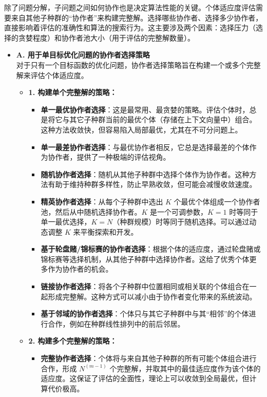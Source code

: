 除了问题分解，子问题之间如何协作也是决定算法性能的关键。个体适应度评估需要来自其他子种群的“协作者”来构建完整解。选择哪些协作者、选择多少协作者，直接影响着评估的准确性和算法的搜索行为。这主要涉及两个因素：选择压力（选择的贪婪程度）和协作者池大小（用于评估的完整解数量）。
\begin{itemize}
    \item \textbf{A. 用于单目标优化问题的协作者选择策略} \\
    对于只有一个目标函数的优化问题，协作者选择策略旨在构建一个或多个完整解来评估个体适应度。
    \begin{itemize}
        \item \textbf{1. 构建单个完整解的策略：}
        \begin{itemize}
            \item \textbf{单一最优协作者选择}：这是最常用、最贪婪的策略。评估个体时，总是将它与其它子种群当前的最优个体（存储在上下文向量中）组合。这种方法收敛快，但容易陷入局部最优，尤其在不可分问题上。
            \item \textbf{单一最差协作者选择}：与最优协作者相反，它总是选择最差的个体作为协作者，提供了一种极端的评估视角。
            \item \textbf{随机协作者选择}：随机从其他子种群中选择个体作为协作者。这种方法有助于维持种群多样性，防止早熟收敛，但可能会减慢收敛速度。
            \item \textbf{精英协作者选择}：从每个子种群中选出 $K$ 个最优个体组成一个协作者池，然后从中随机选择协作者。$K$ 是一个可调参数，$K=1$ 时等同于单一最优选择，$K=N$（种群规模）时等同于随机选择。可以通过动态调整 $K$ 来平衡探索和开发。
            \item \textbf{基于轮盘赌/锦标赛的协作者选择}：根据个体的适应度，通过轮盘赌或锦标赛等选择机制，从其他子种群中选择协作者。这给了优秀个体更多作为协作者的机会。
            \item \textbf{链接协作者选择}：将各个子种群中位置相同或相关联的个体组合在一起形成完整解。这种方式可以减小由于协作者变化带来的系统波动。
            \item \textbf{基于邻域的协作者选择}：个体只与其它子种群中与其“相邻”的个体进行合作，例如在种群线性排列中的前后邻居。
        \end{itemize}
        \item \textbf{2. 构建多个完整解的策略：}
        \begin{itemize}
            \item \textbf{完整协作者选择}：个体将与来自其他子种群的所有可能个体组合进行合作，形成 $N^{(m-1)}$ 个完整解，并取其中的最佳适应度作为该个体的适应度。这保证了评估的全面性，理论上可以收敛到全局最优，但计算代价极高。

\end{itemize}
\end{itemize}
\end{itemize}
